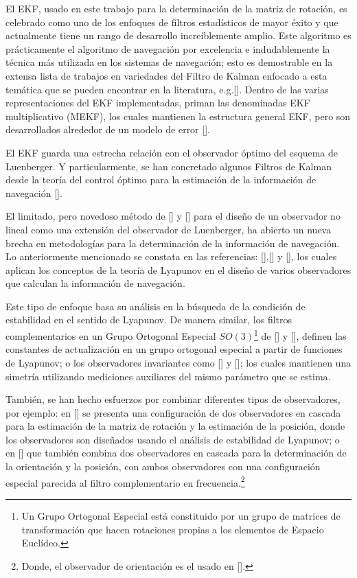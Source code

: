 \documentclass[10pt]{report}
\numberwithin{equation}{chapter}
\numberwithin{algorithm}{chapter}
\begin{document}
El EKF, usado en este trabajo para la determinación de la matriz de rotación, es celebrado como uno de los enfoques de filtros estadísticos de mayor éxito y que actualmente tiene un rango de desarrollo increíblemente amplio. Este algoritmo es prácticamente el algoritmo de navegación por excelencia e indudablemente la técnica más utilizada en los sistemas de navegación; esto es demostrable en la extensa lista de trabajos en variedades del Filtro de Kalman enfocado a esta temática que se pueden encontrar en la literatura, e.g.[\cite{Faruki2000, Marins2001, Gandhi2007, Sabatini2006, Bistrovs2012}]. Dentro de las varias representaciones del EKF implementadas, priman las denominadas EKF multiplicativo (MEKF), los cuales mantienen la estructura general EKF, pero son desarrollados alrededor de un modelo de error [\cite{Friedland1978,Benson1975}].\par
El EKF guarda una estrecha relación con el observador óptimo del esquema de Luenberger. Y particularmente, se han concretado algunos Filtros de Kalman desde la teoría del control óptimo para la estimación de la información de navegación [\cite{Smith1995}].\par
%
El limitado, pero novedoso método de [\cite{Kou1975}] y [\cite{Thau1973}] para el diseño de un observador no lineal como una extensión del observador de Luenberger, ha abierto un nueva brecha en metodologías para la determinación de la información de navegación. Lo anteriormente mencionado se constata en las referencias: [\cite{Vik2001}],[\cite{Thienel2003}] y [\cite{Hua2009}], los cuales aplican los conceptos de la teoría de Lyapunov en el diseño de varios observadores que calculan la información de navegación.\par
Este tipo de enfoque basa su análisis en la búsqueda de la condición de estabilidad en el sentido de Lyapunov. De manera similar, los filtros complementarios en un Grupo Ortogonal Especial $SO(3)$\footnote{Un Grupo Ortogonal Especial está constituido por un grupo de matrices de transformación que hacen rotaciones propias a los elementos de Espacio Euclídeo.} de [\cite{Mahony2008}] y [\cite{Scandaro2011}], definen las constantes de actualización en un grupo ortogonal especial a partir de funciones de Lyapunov; o los observadores invariantes como [\cite{Bonabel2008}] y [\cite{Martin2008}]; los cuales mantienen una simetría utilizando mediciones auxiliares del mismo parámetro que se estima. %
\par
%
También, se han hecho esfuerzos por combinar diferentes tipos de observadores, por ejemplo: en [\cite{Vasconcelos2008}] se presenta una configuración de dos observadores en cascada para la estimación de la matriz de rotación y la estimación de la posición, donde los observadores son diseñados usando el análisis de estabilidad de Lyapunov; o en [\cite{Scandaro2011}] que también combina dos observadores en cascada para la determinación de la orientación y la posición, con ambos observadores con una configuración especial parecida al filtro complementario en frecuencia.\footnote{Donde, el observador de orientación es el usado en [\cite{Mahony2008}]. }
\end{document}
